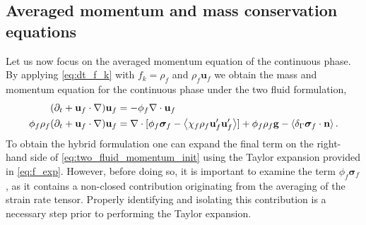 







\subsection{Averaged momentum and mass conservation equations}



Let us now focus on the averaged momentum equation of the continuous phase. 
By applying \eqref{eq:dt_f_k} with $f_k = \rho_f$ and $\rho_f\textbf{u}_f$ we obtain the mass and momentum equation for the continuous phase under the two fluid formulation, 
\begin{align}
    (\pddt + \textbf{u}_f\cdot \grad)\textbf{u}_f&=-\phi_f \div \textbf{u}_f
    \label{eq:mass_init}\\
    \phi_f \rho_f(\pddt + \textbf{u}_f  \cdot \grad) \textbf{u}_f
    &= 
    \div [\phi_f \bm\sigma_f-  \avg{\chi_f\rho_f \textbf{u}_f'\textbf{u}_f'}]
    + \phi_f \rho_f \textbf{g}
    - \avg{\delta_\Gamma \bm\sigma_f\cdot \textbf{n}}.
    \label{eq:two_fluid_momentum_init}
\end{align} 
To obtain the hybrid formulation one can expand the final term on the right-hand side of \ref{eq:two_fluid_momentum_init} using the Taylor expansion provided in \ref{eq:f_exp}.  
However, before doing so, it is important to examine the term \( \phi_f \bm\sigma_f \), as it contains a non-closed contribution originating from the averaging of the strain rate tensor. %
Properly identifying and isolating this contribution is a necessary step prior to performing the Taylor expansion.


